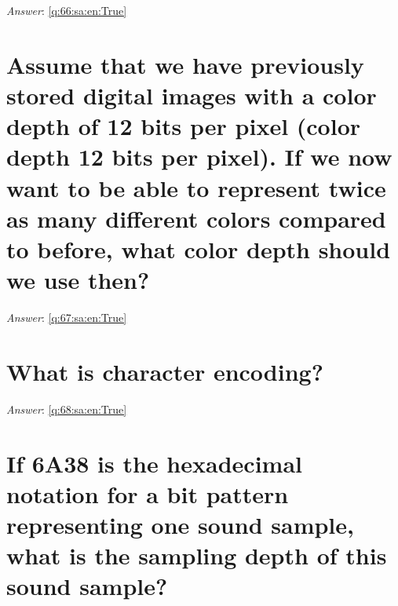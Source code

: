 \documentclass[a4paper,11pt,oneside]{book}
\begin{document}
\begin{sloppypar}
\label{q:66:sa:en:False}

\vspace{2cm}

\noindent\makebox[\textwidth]{\hrulefill}

\vspace{1cm}

\textit{Answer}: \autoref{q:66:sa:en:True}



\section{Assume that we have previously stored digital images with a color depth of 12 bits per pixel (color depth 12 bits per pixel). If we now want to be able to represent twice as many different colors compared to before, what color depth should we use then?}

\label{q:67:sa:en:False}

\vspace{2cm}

\noindent\makebox[\textwidth]{\hrulefill}

\vspace{1cm}

\textit{Answer}: \autoref{q:67:sa:en:True}



\section{What is character encoding?}

\label{q:68:sa:en:False}

\vspace{2cm}

\noindent\makebox[\textwidth]{\hrulefill}

\vspace{1cm}

\textit{Answer}: \autoref{q:68:sa:en:True}



\section{If 6A38 is the hexadecimal notation for a bit pattern representing one sound sample, what is the sampling depth of this sound sample?}

\label{q:71:sa:en:False}

\vspace{2cm}

\noindent\makebox[\textwidth]{\hrulefill}


\end{sloppypar}
\end{document}

